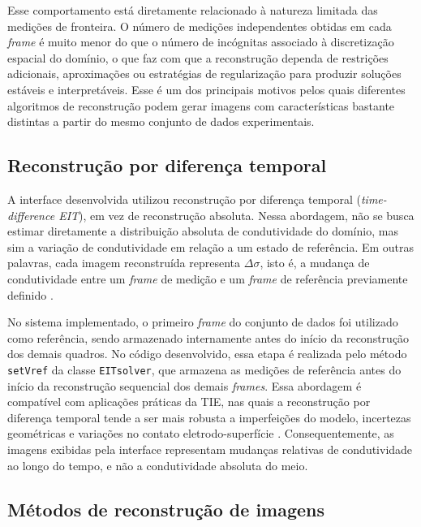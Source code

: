 Esse comportamento está diretamente relacionado à natureza limitada das medições de fronteira. O número de medições independentes obtidas em cada \textit{frame} é muito menor do que o número de incógnitas associado à discretização espacial do domínio, o que faz com que a reconstrução dependa de restrições adicionais, aproximações ou estratégias de regularização para produzir soluções estáveis e interpretáveis. Esse é um dos principais motivos pelos quais diferentes algoritmos de reconstrução podem gerar imagens com características bastante distintas a partir do mesmo conjunto de dados experimentais.

\subsection{Reconstrução por diferença temporal}
\label{subsec:diferenca_temporal}

A interface desenvolvida utilizou reconstrução por diferença temporal (\textit{time-difference EIT}), em vez de reconstrução absoluta. Nessa abordagem, não se busca estimar diretamente a distribuição absoluta de condutividade do domínio, mas sim a variação de condutividade em relação a um estado de referência. Em outras palavras, cada imagem reconstruída representa \(\Delta \sigma\), isto é, a mudança de condutividade entre um \textit{frame} de medição e um \textit{frame} de referência previamente definido \cite{Putensen2019}.

No sistema implementado, o primeiro \textit{frame} do conjunto de dados foi utilizado como referência, sendo armazenado internamente antes do início da reconstrução dos demais quadros. No código desenvolvido, essa etapa é realizada pelo método \texttt{setVref} da classe \texttt{EITsolver}, que armazena as medições de referência antes do início da reconstrução sequencial dos demais \textit{frames}. Essa abordagem é compatível com aplicações práticas da TIE, nas quais a reconstrução por diferença temporal tende a ser mais robusta a imperfeições do modelo, incertezas geométricas e variações no contato eletrodo-superfície \cite{Putensen2019}. Consequentemente, as imagens exibidas pela interface representam mudanças relativas de condutividade ao longo do tempo, e não a condutividade absoluta do meio.

\subsection{Métodos de reconstrução de imagens}
\label{subsec:metodos_reconstrucao_imagens}


